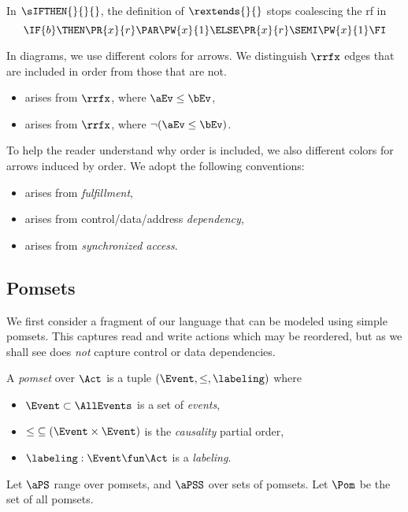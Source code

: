 In $\sIFTHEN{}{}{}$, the definition of $\rextends{}{}$ stops coalescing the rf in
\begin{displaymath}
  \IF{b}\THEN\PR{x}{r}\PAR\PW{x}{1}\ELSE\PR{x}{r}\SEMI\PW{x}{1}\FI
\end{displaymath}


In diagrams, we use different colors for arrows.  We distinguish
$\rrfx$ edges that are included in order from those that are not.
\begin{itemize}
\item \makebox{$\aEv\xrf\bEv$} arises from $\rrfx$, where $\aEv\le\bEv$,
\item \makebox{$\aEv\xrfint\bEv$} arises from $\rrfx$, where $\lnot(\aEv\le\bEv)$.
\end{itemize}
To help the reader understand why order is included, we also different colors
for arrows induced by order.  We adopt the following conventions:
\begin{itemize}  
\item \makebox{$\aEv\xwk\bEv$} arises from \emph{fulfillment},
\item \makebox{$\aEv\xpo\bEv$} arises from control/data/address \emph{dependency},
\item \makebox{$\aEv\xsync\bEv$} arises from \emph{synchronized access}.
\end{itemize}


\subsection{Pomsets}
\label{sec:pomsets}

We first consider a fragment of our language that can be modeled using simple
pomsets.  This captures read and write actions which may be reordered,
but as we shall see does \emph{not} capture control or data dependencies.

\begin{definition}
  \label{def:pomsets}
  A \emph{pomset} over $\Act$ is a tuple
  $(\Event, {\le}, \labeling)$ where
  \begin{itemize}
  \item $\Event\subset\AllEvents$ is a set of \emph{events},
  \item
    ${\le} \subseteq (\Event\times\Event)$ is the \emph{causality} partial order, 
  \item
    $\labeling: \Event \fun \Act$ is a \emph{labeling}.
  \end{itemize}
\end{definition}
Let $\aPS$ range over pomsets, and $\aPSS$ over sets of pomsets.  Let $\Pom$
be the set of all pomsets.

